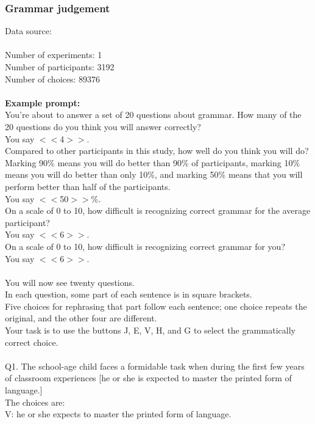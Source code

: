 \documentclass[pdflatex,sn-nature]{sn-jnl}%
\theoremstyle{thmstyleone}%
\theoremstyle{thmstyletwo}%
\theoremstyle{thmstylethree}%
\begin{document}
\subsubsection*{Grammar judgement}
Data source: \cite{jansen2021rational} \\ $~$ \\
Number of experiments: 1 $~$\\ 
Number of participants: 3192 $~$\\ 
Number of choices: 89376 $~$\\ 
 $~$\\ 
\textbf{Example prompt:}
 $~$\\ 
You're about to answer a set of 20 questions about grammar. How many of the 20 questions do you think you will answer correctly? $~$\\ 
You say $<<$4$>>$. $~$\\ 
Compared to other participants in this study, how well do you think you will do? Marking 90\% means you will do better than 90\% of participants, marking 10\% means you will do better than only 10\%, and marking 50\% means that you will perform better than half of the participants. $~$\\ 
You say $<<$50$>>$\%. $~$\\ 
On a scale of 0 to 10, how difficult is recognizing correct grammar for the average participant? $~$\\ 
You say $<<$6$>>$. $~$\\ 
On a scale of 0 to 10, how difficult is recognizing correct grammar for you? $~$\\ 
You say $<<$6$>>$. $~$\\ 
 $~$\\ 
You will now see twenty questions. $~$\\ 
In each question, some part of each sentence is in square brackets. $~$\\ 
Five choices for rephrasing that part follow each sentence; one choice repeats the original, and the other four are different. $~$\\ 
Your task is to use the buttons J, E, V, H, and G to select the grammatically correct choice. $~$\\ 
 $~$\\ 
Q1. The school-age child faces a formidable task when during the first few years of classroom experiences [he or she is expected to master the printed form of language.] $~$\\ 
The choices are: $~$\\ 
V: he or she expects to master the printed form of language. $~$\\ 
\end{document}
